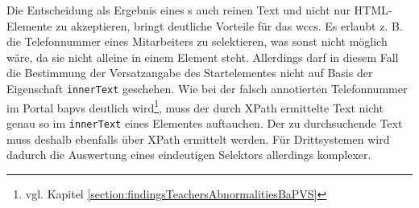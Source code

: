     Die Entscheidung als Ergebnis eines {\xpathSelector}s auch reinen Text und nicht nur
    HTML-Elemente zu akzeptieren, bringt deutliche Vorteile für das \gls{wccs}.
    Es erlaubt z. B. die Telefonnummer eines Mitarbeiters zu selektieren,
    was sonst nicht möglich wäre, da sie nicht alleine in einem Element steht.
    Allerdings darf in diesem Fall die Bestimmung der Versatzangabe des Startelementes nicht auf
    Basis der Eigenschaft \texttt{innerText} geschehen.
    Wie bei der falsch annotierten Telefonnummer im Portal \gls{bapvs} deutlich
    wird\footnote{vgl. Kapitel \ref{section:findingsTeachersAbnormalitiesBaPVS}},
    muss der durch XPath ermittelte Text nicht genau so im \texttt{innerText} eines Elementes auftauchen.
    Der zu durchsuchende Text muss deshalb ebenfalls über XPath ermittelt werden.
    Für Drittsystemen wird dadurch die Auswertung eines eindeutigen Selektors allerdings komplexer.
